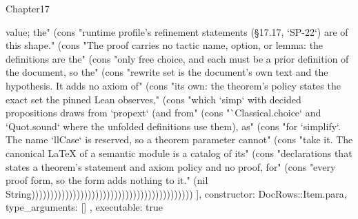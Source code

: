 \begin{lexlean}{Chapter17}
\begin{semanticmodule}
{{value; the" (cons "runtime profile's refinement statements (§17.17, `SP-22`) are of this shape." (cons "The proof carries no tactic name, option, or lemma: the definitions are the" (cons "only free choice, and each must be a prior definition of the document, so the" (cons "rewrite set is the document's own text and the hypothesis. It adds no axiom of" (cons "its own: the theorem's policy states the exact set the pinned Lean observes," (cons "which `simp` with decided propositions draws from `propext` (and from" (cons "`Classical.choice` and `Quot.sound` where the unfolded definitions use them), as" (cons "for `simplify`. The name `llCase` is reserved, so a theorem parameter cannot" (cons "take it. The canonical LaTeX of a semantic module is a catalog of its" (cons "declarations that states a theorem's statement and axiom policy and no proof, for" (cons "every proof form, so the form adds nothing to it." (nil String)))))))))))))))))))))))))))))))))))))))))))
    ],
    constructor: DocRows::Item.para,
    type_arguments: []
  },
  executable: true
}


\end{semanticmodule}
\end{lexlean}
